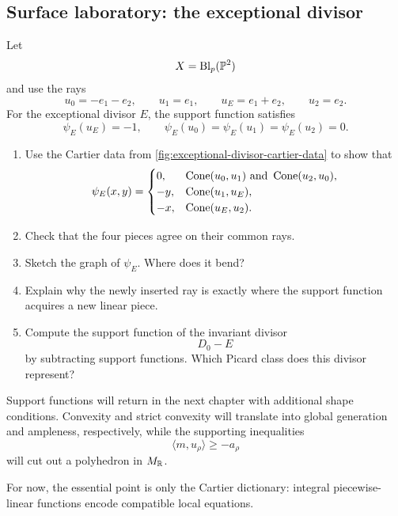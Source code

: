 \subsection{Surface laboratory: the exceptional divisor}

Let
\[
X=\Blp{\PP^2}{p}
\]
and use the rays
\[
u_0=-e_1-e_2,\qquad
u_1=e_1,\qquad
u_E=e_1+e_2,\qquad
u_2=e_2.
\]
For the exceptional divisor \(E\), the support function satisfies
\[
\psi_E(u_E)=-1,
\qquad
\psi_E(u_0)=\psi_E(u_1)=\psi_E(u_2)=0.
\]

\begin{surfacelaboratory}
\begin{enumerate}[label=(\alph*),wide=0pt]
\item Use the Cartier data from
\cref{fig:exceptional-divisor-cartier-data} to show that
\[
\psi_E(x,y)
=
\begin{cases}
0,
&
\Cone{u_0,u_1}\text{ and }\Cone{u_2,u_0},
\\
-y,
&
\Cone{u_1,u_E},
\\
-x,
&
\Cone{u_E,u_2}.
\end{cases}
\]

\item Check that the four pieces agree on their common rays.

\item Sketch the graph of \(\psi_E\). Where does it bend?

\item Explain why the newly inserted ray is exactly where the support
function acquires a new linear piece.

\item Compute the support function of the invariant divisor
\[
D_0-E
\]
by subtracting support functions. Which Picard class does this divisor
represent?
\end{enumerate}
\end{surfacelaboratory}

\begin{observation}
Support functions will return in the next chapter with additional
shape conditions. Convexity and strict convexity will translate into
global generation and ampleness, respectively, while the supporting
inequalities
\[
\langle m,u_\rho\rangle\geq-\!a_\rho
\]
will cut out a polyhedron in \(M_\RR\).

For now, the essential point is only the Cartier dictionary:
integral piecewise-linear functions encode compatible local
equations.
\end{observation}

